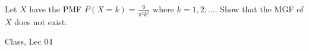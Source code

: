 \begin{samepage}
\begin{ex}
Let $X$ have the PMF $P(X = k) = \frac{6}{\pi ^2 k^2}$ where $k = 1,2, ...$.
Show that the MGF of $X$ does not exist.
\end{ex}
\begin{source}
Class, Lec 04
\end{source}
\end{samepage}
